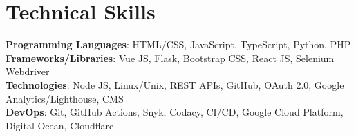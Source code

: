 \section{Technical Skills}
 \begin{itemize}[leftmargin=0.15in, label={}]
    \small{\item{
     \textbf{Programming Languages}{: HTML/CSS, JavaScript, TypeScript, Python, PHP} \\
     \textbf{Frameworks/Libraries}{: Vue JS, Flask, Bootstrap CSS, React JS, Selenium Webdriver} \\
     \textbf{Technologies}{: Node JS, Linux/Unix, REST APIs, GitHub, OAuth 2.0, Google Analytics/Lighthouse, CMS } \\
     \textbf{DevOps}{: Git, GitHub Actions, Snyk, Codacy, CI/CD, Google Cloud Platform, Digital Ocean, Cloudflare } 
    }}
 \end{itemize}  